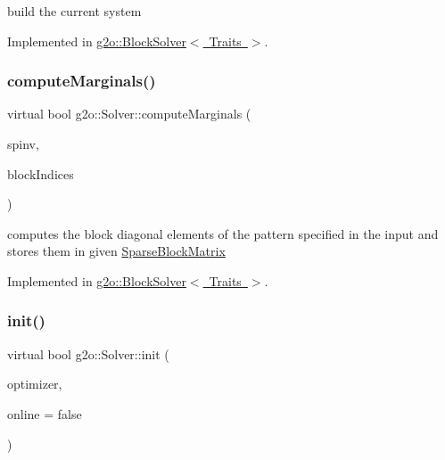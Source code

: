 build the current system 

Implemented in \mbox{\hyperlink{classg2o_1_1_block_solver_a2654a8d52f38e5ce23720a8de302e2e7}{g2o\+::\+Block\+Solver$<$ Traits $>$}}.

\mbox{\label{classg2o_1_1_solver_afc33768e6c024e11d9e3c9d938b59b7f}} 
\subsubsection{\texorpdfstring{compute\+Marginals()}{computeMarginals()}}
{\footnotesize\ttfamily virtual bool g2o\+::\+Solver\+::compute\+Marginals (\begin{DoxyParamCaption}\item[{\mbox{\hyperlink{classg2o_1_1_sparse_block_matrix}{Sparse\+Block\+Matrix}}$<$ Matrix\+Xd $>$ \&}]{spinv,  }\item[{const std\+::vector$<$ std\+::pair$<$ int, int $>$ $>$ \&}]{block\+Indices }\end{DoxyParamCaption})\hspace{0.3cm}{\ttfamily [pure virtual]}}

computes the block diagonal elements of the pattern specified in the input and stores them in given \mbox{\hyperlink{classg2o_1_1_sparse_block_matrix}{Sparse\+Block\+Matrix}} 

Implemented in \mbox{\hyperlink{classg2o_1_1_block_solver_ac21cd7e2c9b8a1414f7a2dccb0d30a0e}{g2o\+::\+Block\+Solver$<$ Traits $>$}}.

\mbox{\label{classg2o_1_1_solver_a532174e1ee53642880d2d59c128b037b}} 
\subsubsection{\texorpdfstring{init()}{init()}}
{\footnotesize\ttfamily virtual bool g2o\+::\+Solver\+::init (\begin{DoxyParamCaption}\item[{\mbox{\hyperlink{classg2o_1_1_sparse_optimizer}{Sparse\+Optimizer}} $\ast$}]{optimizer,  }\item[{bool}]{online = {\ttfamily false} }\end{DoxyParamCaption})\hspace{0.3cm}{\ttfamily [pure virtual]}}

